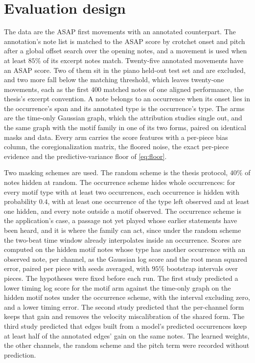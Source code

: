 \section{Evaluation design}\label{sec:motif-design}
The data are the ASAP first movements with an annotated counterpart. The
annotation's note list is matched to the ASAP score by crotchet onset and
pitch after a global offset search over the opening notes, and a movement
is used when at least $85\%$ of its excerpt notes match. Twenty-five
annotated movements have an ASAP score. Two of them sit in the piano
held-out test set and are excluded, and two more fall below the matching
threshold, which leaves twenty-one movements, each as the first $400$
matched notes of one aligned performance, the thesis's excerpt convention.
A note belongs to an occurrence when its onset lies in the occurrence's
span and its annotated type is the occurrence's type. The arms are the
time-only Gaussian graph, which the attribution studies single out, and the
same graph with the motif family in one of its two forms, paired on
identical masks and data. Every arm carries the score features with a
per-piece bias column, the coregionalization matrix, the floored noise, the
exact per-piece evidence and the predictive-variance floor of
\eqref{eq:floor}.

Two masking schemes are used. The random scheme is the thesis protocol,
$40\%$ of notes hidden at random. The occurrence scheme hides whole
occurrences: for every motif type with at least two occurrences, each
occurrence is hidden with probability $0.4$, with at least one occurrence of
the type left observed and at least one hidden, and every note outside a
motif observed. The occurrence scheme is the application's case, a passage
not yet played whose earlier statements have been heard, and it is where the
family can act, since under the random scheme the two-beat time window
already interpolates inside an occurrence. Scores are computed on the hidden
motif notes whose type has another occurrence with an observed note, per
channel, as the Gaussian log score and the root mean squared error, paired
per piece with seeds averaged, with $95\%$ bootstrap intervals over pieces.
The hypotheses were fixed before each run. The first study predicted a
lower timing log score for the motif arm against the time-only graph on the
hidden motif notes under the occurrence scheme, with the interval excluding
zero, and a lower timing error. The second study predicted that the
per-channel form keeps that gain and removes the velocity miscalibration
of the shared form. The third study predicted that edges built from a
model's predicted occurrences keep at least half of the annotated edges'
gain on the same notes. The learned weights, the other channels, the random
scheme and the pitch term were recorded without prediction.

